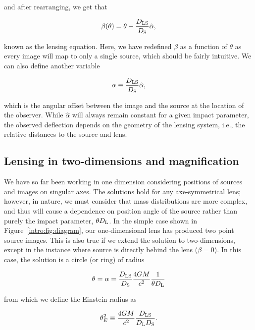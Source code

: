 \noindent and after rearranging, we get that

\begin{equation}
\beta(\theta) = \theta - \frac{D_\mathrm{LS}}{D_\mathrm{S}} \hat\alpha,
\end{equation}

\noindent known as the lensing equation. Here, we have redefined $\beta$ as a function of $\theta$ as every image will map to only a single source, which should be fairly intuitive. We can also define another variable

\begin{equation}
\alpha \equiv  \frac{D_\mathrm{LS}}{D_\mathrm{S}} \hat\alpha,
\label{intro:eqn:dlsds}
\end{equation}

\noindent which is the angular offset between the image and the source at the location of the observer. While $\hat\alpha$ will always remain constant for a given impact parameter, the observed deflection depends on the geometry of the lensing system, i.e., the relative distances to the source and lens.

\subsection{Lensing in two-dimensions and magnification}
\label{intro:sec:magnification}

We have so far been working in one dimension considering positions of sources and images on singular axes. The solutions hold for any axe-symmetrical lens; however, in nature, we must consider that mass distributions are more complex, and thus will cause a dependence on position angle of the source rather than purely the impact parameter, $\theta D_\mathrm{L}$. In the simple case shown in Figure~\ref{intro:fig:diagram}, our one-dimensional lens has produced two point source images. This is also true if we extend the solution to two-dimensions, except in the instance where source is directly behind the lens ($\beta=0$). In this case, the solution is a circle (or ring) of radius

\begin{equation}
\theta = \alpha = \frac{D_\mathrm{LS}}{D_\mathrm{S}} \frac{4GM}{c^2} \frac{1}{\theta D_\mathrm{L}}
\end{equation} 

\noindent from which we define the Einstein radius as

\begin{equation}
\theta_E^2 \equiv \frac{4GM}{c^2} \frac{D_\mathrm{LS}}{D_\mathrm{L}D_\mathrm{S}}.
\end{equation}

